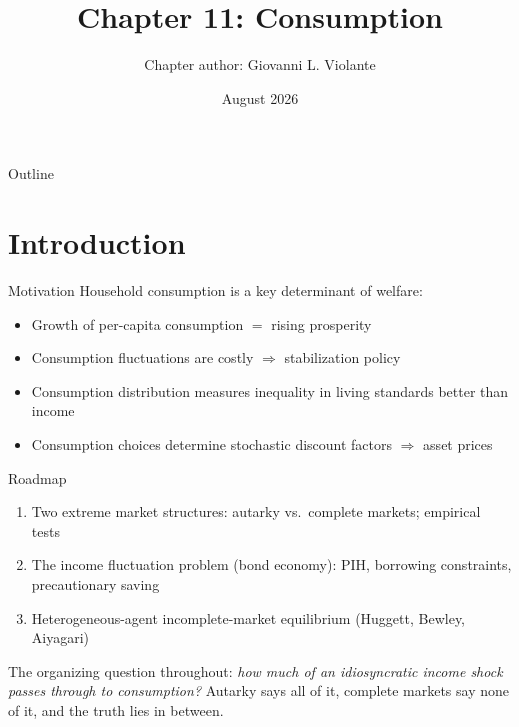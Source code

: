 \documentclass[blue]{beamer}
\title[Chapter11]{Chapter 11: Consumption}
\author[Giovanni L. Violante]{Chapter author: Giovanni L. Violante}
\date[August 2026]{August 2026}
\begin{document}
	\frame
	{
		\titlepage
	}
	
	
	\begin{frame}{Outline}
		\tableofcontents
	\end{frame}
	
	\section{Introduction}
	
	\begin{frame}{Motivation}
		Household consumption is a key determinant of welfare:
		\begin{itemize}
			\item Growth of per-capita consumption $=$ rising prosperity
			\item Consumption fluctuations are costly $\Rightarrow$ stabilization policy
			\item Consumption distribution measures inequality in living standards better than income
			\item Consumption choices determine stochastic discount factors $\Rightarrow$ asset prices
		\end{itemize}
		
	\end{frame}
	
	\begin{frame}{Roadmap}
		\begin{enumerate}
			\item Two extreme market structures: autarky vs.\ complete markets; empirical tests
			\item The income fluctuation problem (bond economy): PIH, borrowing constraints, precautionary saving
			\item Heterogeneous-agent incomplete-market equilibrium (Huggett, Bewley, Aiyagari)
		\end{enumerate}
		
		\bigskip
		The organizing question throughout: \emph{how much of an idiosyncratic income shock passes through to consumption?} Autarky says all of it, complete markets say none of it, and the truth lies in between.
	\end{frame}
	
\end{document}

